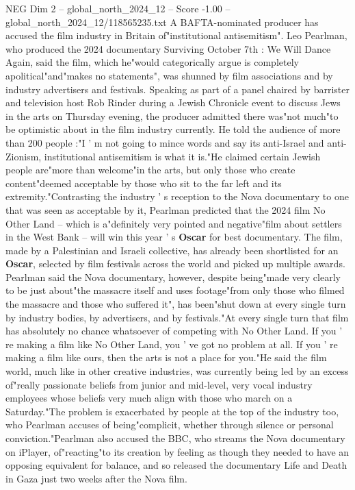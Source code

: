 \begin{textsample}{NEG Dim 2 – global\_north\_2024\_12 – Score -1.00 – global\_north\_2024\_12/118565235.txt}  \label{ex:f2_neg_166}
A BAFTA-nominated producer has accused the film industry in Britain of"institutional antisemitism".
Leo Pearlman, who produced the 2024 documentary Surviving October 7th : We Will Dance Again, said the film, which he"would categorically argue is completely apolitical"and"makes no statements", was shunned by film associations and by industry advertisers and festivals.
Speaking as part of a panel chaired by barrister and television host Rob Rinder during a Jewish Chronicle event to discuss Jews in the arts on Thursday evening, the producer admitted there was"not much"to be optimistic about in the film industry currently.
He told the audience of more than 200 people :"I ' m not going to mince words and say its anti-Israel and anti-Zionism, institutional antisemitism is what it is."He claimed certain Jewish people are"more than welcome"in the arts, but only those who create content"deemed acceptable by those who sit to the far left and its extremity."Contrasting the industry ' s reception to the Nova documentary to one that was seen as acceptable by it, Pearlman predicted that the 2024 film No Other Land -- which is a"definitely very pointed and negative"film about settlers in the West Bank -- will win this year ' s \textbf{Oscar} for best documentary.
The film, made by a Palestinian and Israeli collective, has already been shortlisted for an \textbf{Oscar}, selected by film festivals across the world and picked up multiple awards.
Pearlman said the Nova documentary, however, despite being"made very clearly to be just about"the massacre itself and uses footage"from only those who filmed the massacre and those who suffered it", has been"shut down at every single turn by industry bodies, by advertisers, and by festivals."At every single turn that film has absolutely no chance whatsoever of competing with No Other Land.
If you ' re making a film like No Other Land, you ' ve got no problem at all.
If you ' re making a film like ours, then the arts is not a place for you."He said the film world, much like in other creative industries, was currently being led by an excess of"really passionate beliefs from junior and mid-level, very vocal industry employees whose beliefs very much align with those who march on a Saturday."The problem is exacerbated by people at the top of the industry too, who Pearlman accuses of being"complicit, whether through silence or personal conviction."Pearlman also accused the BBC, who streams the Nova documentary on iPlayer, of"reacting"to its creation by feeling as though they needed to have an opposing equivalent for balance, and so released the documentary Life and Death in Gaza just two weeks after the Nova film.

\end{textsample}
